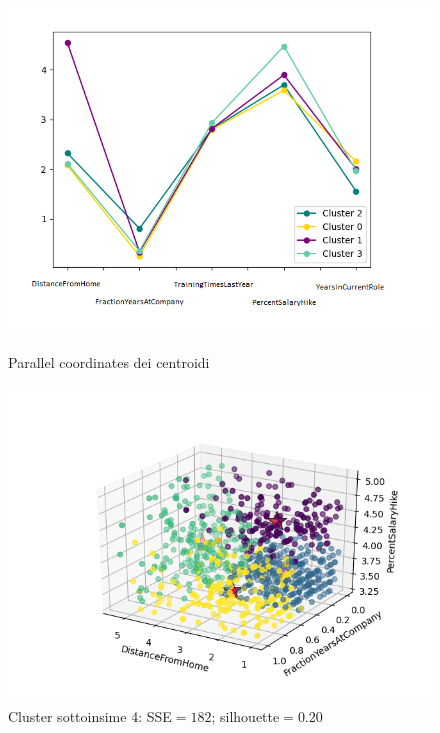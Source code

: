 \documentclass[a4paper,9pt]{article}
\begin{document}
\begin{figure}[H]
\begin{minipage}[b]{0.47\textwidth}
\centering
\includegraphics[width=\textwidth]{parr cor frac6.png}
\caption{Parallel coordinates dei centroidi}
\label{etichetta1}
\end{minipage}
\hfill
\begin{minipage}[b]{0.55\textwidth}
\includegraphics[scale=0.6]{FractionYear_Distance_Percent_CENTROIDI6.png}
\caption{Cluster sottoinsime 4: SSE$=182$; silhouette$=0.20$}
\label{etichetta2}
\end{minipage}
\end{figure}
\end{document}
